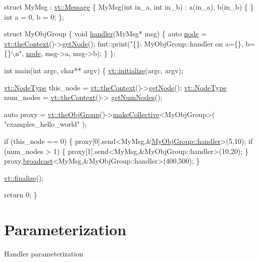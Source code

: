 \begin{DoxyCodeInclude}
\textcolor{keyword}{struct }MyMsg : \hyperlink{structvt_1_1messaging_1_1_active_msg}{vt::Message} \{
  MyMsg(\textcolor{keywordtype}{int} in\_a, \textcolor{keywordtype}{int} in\_b) : a(in\_a), b(in\_b) \{ \}
  \textcolor{keywordtype}{int} a = 0, b = 0;
\};

\textcolor{keyword}{struct }MyObjGroup \{
  \textcolor{keywordtype}{void} \hyperlink{namespacevt_1_1config_a6bd1d6215bda0d8ca02811798399f689a82a0081a94d5c5dfd18b0b3f7eca64b7}{handler}(MyMsg* msg) \{
    \textcolor{keyword}{auto} \hyperlink{namespacevt_1_1config_a46e57c33bee1b9f1fa95455af86d80e0a576033c81e2ddd03d721ecef3b1b3f81}{node} = \hyperlink{namespacevt_a26551fe0e6e6a1371111df5b12c7e92c}{vt::theContext}()->\hyperlink{structvt_1_1ctx_1_1_context_a0d52c263ce8516546a67443d9a86fa5f}{getNode}();
    fmt::print(\textcolor{stringliteral}{"\{\}: MyObjGroup::handler on a=\{\}, b=\{\}\(\backslash\)n"}, \hyperlink{namespacevt_1_1config_a46e57c33bee1b9f1fa95455af86d80e0a576033c81e2ddd03d721ecef3b1b3f81}{node}, msg->a, msg->b);
  \}
\};

\textcolor{keywordtype}{int} main(\textcolor{keywordtype}{int} argc, \textcolor{keywordtype}{char}** argv) \{
  \hyperlink{namespacevt_aae6ab5af3e11886ce73c4c3ffa008201}{vt::initialize}(argc, argv);

  \hyperlink{namespacevt_a866da9d0efc19c0a1ce79e9e492f47e2}{vt::NodeType} this\_node = \hyperlink{namespacevt_a26551fe0e6e6a1371111df5b12c7e92c}{vt::theContext}()->\hyperlink{structvt_1_1ctx_1_1_context_a0d52c263ce8516546a67443d9a86fa5f}{getNode}();
  \hyperlink{namespacevt_a866da9d0efc19c0a1ce79e9e492f47e2}{vt::NodeType} num\_nodes = \hyperlink{namespacevt_a26551fe0e6e6a1371111df5b12c7e92c}{vt::theContext}()->
      \hyperlink{structvt_1_1ctx_1_1_context_a7f41071aadf6d5fa9e1b6c703c5ff19d}{getNumNodes}();

  \textcolor{keyword}{auto} proxy = \hyperlink{namespacevt_a833f0115b692f578167cbd88e30d39c5}{vt::theObjGroup}()->\hyperlink{structvt_1_1objgroup_1_1_obj_group_manager_a50e0d8498d142a05773ed5a046803b2b}{makeCollective}<MyObjGroup>(
    \textcolor{stringliteral}{"examples\_hello\_world"}
  );

  \textcolor{keywordflow}{if} (this\_node == 0) \{
    proxy[0].send<MyMsg,&\hyperlink{namespacevt_1_1config_a6bd1d6215bda0d8ca02811798399f689a82a0081a94d5c5dfd18b0b3f7eca64b7}{MyObjGroup::handler}>(5,10);
    \textcolor{keywordflow}{if} (num\_nodes > 1) \{
      proxy[1].send<MyMsg,&MyObjGroup::handler>(10,20);
    \}
    proxy.\hyperlink{structvt_1_1objgroup_1_1proxy_1_1_proxy_a0b716ca776b1f06e0d7d45afbe9e5274}{broadcast}<MyMsg,&MyObjGroup::handler>(400,500);
  \}

  \hyperlink{namespacevt_a540d90dbd6e97b69f1dcbc9ee9314cff}{vt::finalize}();

  \textcolor{keywordflow}{return} 0;
\}
\end{DoxyCodeInclude}
\hypertarget{param}{}\section{Parameterization}\label{param}
Handler parameterization

